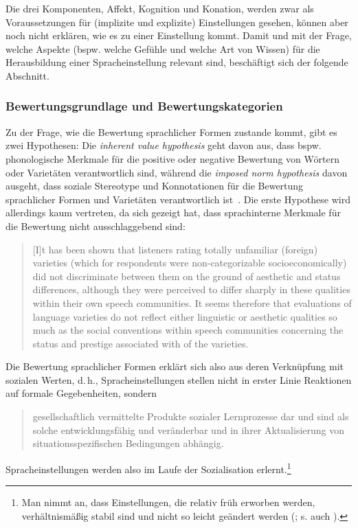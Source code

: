 Die drei Komponenten, Affekt, Kognition und Konation, werden zwar als Voraussetzungen für (implizite und explizite) Einstellungen gesehen, können aber noch nicht erklären, wie es zu einer Einstellung kommt. 
Damit und mit der Frage, welche Aspekte (bspw. welche Gefühle und welche Art von Wissen) für die Herausbildung einer Spracheinstellung relevant sind, beschäftigt sich der folgende Abschnitt. 
\subsubsection{Bewertungsgrundlage und Bewertungskategorien}
\label{sec:Bewertungsgrundlage}
Zu der Frage, wie die Bewertung sprachlicher Formen zustande kommt, gibt es zwei Hypothesen: 
Die \textit{inherent value hypothesis} geht davon aus, dass bspw. phonologische Merkmale f{\"u}r die positive oder negative Bewertung von W{\"o}rtern oder Variet{\"a}ten verantwortlich sind, w{\"a}hrend die \textit{imposed norm hypothesis} davon ausgeht, dass soziale Stereotype und Konnotationen f{\"u}r die Bewertung sprachlicher Formen und Variet{\"a}ten verantwortlich ist~\citep[s.][5]{Garrett.2012}. 
Die erste Hypothese wird allerdings kaum vertreten, da sich gezeigt hat, dass sprachinterne Merkmale für die Bewertung nicht ausschlaggebend sind: 
\begin{quote}[I]t has been shown that listeners rating totally unfamiliar (foreign) varieties (which for respondents were non-categorizable socioeconomically) did not discriminate between them on the ground of aesthetic and status differences, although they were perceived to differ sharply in these qualities within their own speech communities. It seems therefore that evaluations of language varieties do not reflect either linguistic or aesthetic qualities so much as the social conventions within speech communities concerning the status and prestige associated with  of the varieties.~\citep[585, Hervorhebung im Original]{Giles.1988}\end{quote}
Die Bewertung sprachlicher Formen erklärt sich also aus deren Verknüpfung mit sozialen Werten, d.\,h., Spracheinstellungen stellen nicht in erster Linie Reaktionen auf formale Gegebenheiten, sondern 
\begin{quote}gesellschaftlich vermittelte Produkte sozialer Lernprozesse dar und sind als solche entwicklungsf{\"a}hig und ver{\"a}nderbar und in ihrer Aktualisierung von situationsspezifischen Bedingungen abh{\"a}ngig.~\citep[728]{Neuland.1993}\end{quote}
Spracheinstellungen werden also im Laufe der Sozialisation erlernt.\footnote{Man nimmt an, dass Einstellungen, die relativ fr{\"u}h erworben werden, verhältnismäßig stabil sind und nicht so leicht ge{\"a}ndert werden (\citealp[5]{Garrett2003}; s. auch \citealp[30]{Garrett.2012}).}
